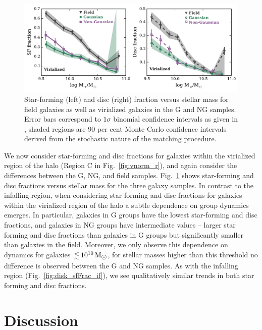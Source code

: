 \documentclass[a4paper,fleqn,usenatbib]{mnras}
\newcommand{\Msun}{\,\mathrm{M_{\sun}}}
\begin{document}
\begin{figure}
  \centering
  \includegraphics[width=\textwidth]{disk_sfFrac95_w2_v.pdf}
  \caption{Star-forming (left) and disc (right) fraction versus stellar mass for
    field galaxies as well as virialized galaxies in the G and NG
    samples.  Error bars correspond to $1 \sigma$ binomial confidence
    intervals as given in \citet{cameron2011}, shaded regions are 90
    per cent Monte Carlo confidence intervals derived from the
    stochastic nature of the matching procedure.}
  \label{fig:disk_sfFrac_v}
\end{figure}

We now consider star-forming and disc fractions for galaxies within
the virialized region of the halo (Region C in
Fig.~\ref{fig:vnorm_r}), and again consider the differences between
the G, NG, and field samples.  Fig.~\ref{fig:disk_sfFrac_v} shows
star-forming and disc fractions versus stellar mass for the three
galaxy samples.  In contrast to the infalling region, when
considering star-forming and
disc fractions for galaxies within the virialized region of the halo a
subtle dependence 
on group dynamics emerges.  In particular, galaxies in G groups have
the lowest star-forming and 
disc fractions, and galaxies in NG groups have intermediate
values -- larger star forming and disc fractions than galaxies in G
groups but significantly smaller than galaxies in the field.
Moreover, we only observe this dependence on dynamics for galaxies
$\la 10^{10}\Msun$, for stellar masses higher than this threshold no
difference is observed between the G and NG samples.  As with the
infalling region (Fig.~\ref{fig:disk_sfFrac_if}), we see qualitatively
similar trends in both star forming and disc fractions.


\section{Discussion}
\label{sec:discussion}
\end{document}
